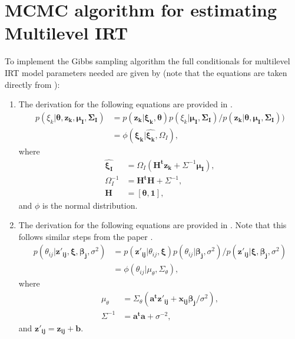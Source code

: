 \documentclass[12pt]{article}
\begin{document}
\section{MCMC algorithm for estimating Multilevel IRT}  \label{sec:full_conditionals_mlirt}
To implement the Gibbs sampling algorithm the full conditionals for multilevel IRT model parameters needed are given by (note that the equations are taken directly from \cite{fox2007multilevel}):
\begin{enumerate}
    \item The derivation for the following equations are provided in \cite{lindley1972bayes}.
        \begin{align*}
        p(\xi_k|\boldsymbol{\theta, z_k, \mu_I, \Sigma_I}) & = p(\boldsymbol{z_k|\xi_k, \theta})p(\xi_k|\boldsymbol{\mu_I, \Sigma_I})/p(\boldsymbol{z_k|\theta, \mu_I, \Sigma_I})) \\
        & = \phi(\boldsymbol{\xi_k}|\hat{\boldsymbol{\xi_k}}, \Omega_I),
        \end{align*} where
        \begin{align*}
            \hat{\boldsymbol{\xi_I}} & = \Omega_I(\boldsymbol{H^tz_k} + \Sigma^{-1}\boldsymbol{\mu_I}), \\
            \Omega_I^{-1} & = \boldsymbol{H^tH} + \Sigma^{-1}, \\
            \boldsymbol{H} & = [\boldsymbol{\theta, 1}],
        \end{align*}
        and $\phi$ is the normal distribution.
        
    \item The derivation for the following equations are provided in \cite{albert1992bayesian}. Note that this follows similar steps from the paper \cite{lindley1972bayes}.
    \begin{align*}
        p(\theta_{ij}| \boldsymbol{z'_{ij}, \xi, \beta_j,} \sigma^2) & = p(\boldsymbol{z'_{ij}}|\theta_{ij}, \boldsymbol{\xi}) p(\theta_{ij}|\boldsymbol{\beta_j}, \sigma^2)/p(\boldsymbol{z'_{ij}}|\boldsymbol{\xi, \beta_j,}\sigma^2)\\
        & = \phi(\theta_{ij}|\mu_\theta, \Sigma_\theta),
    \end{align*} where
    \begin{align*}
        \mu_\theta & = \Sigma_\theta(\boldsymbol{a^tz'_{ij} + x_{ij}\beta_j/}\sigma^2),\\
        \Sigma^{-1} & = \boldsymbol{a^ta} + \sigma^{-2},
    \end{align*}
    and $\boldsymbol{z'_{ij}} = \boldsymbol{z_{ij} + b}$.
    

\end{enumerate}
\end{document}
